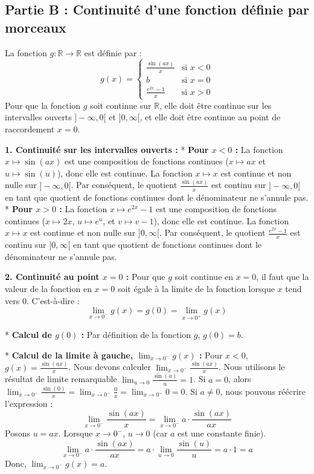 \documentclass[12pt,a4paper]{report}
\begin{document}
\subsection{Partie B : Continuité d'une fonction définie par morceaux}

La fonction $g: \mathbb{R} \to \mathbb{R}$ est définie par :
$$ g(x) = \begin{cases} \frac{\sin(ax)}{x} & \text{si } x < 0 \\ b & \text{si } x = 0 \\ \frac{e^{2x}-1}{x} & \text{si } x > 0 \end{cases} $$
Pour que la fonction $g$ soit continue sur $\mathbb{R}$, elle doit être continue sur les intervalles ouverts $]-\infty, 0[$ et $]0, \infty[$, et elle doit être continue au point de raccordement $x=0$.

\textbf{1. Continuité sur les intervalles ouverts :}
*   \textbf{Pour $x < 0$ :} La fonction $x \mapsto \sin(ax)$ est une composition de fonctions continues ($x \mapsto ax$ et $u \mapsto \sin(u)$), donc elle est continue. La fonction $x \mapsto x$ est continue et non nulle sur $]-\infty, 0[$. Par conséquent, le quotient $\frac{\sin(ax)}{x}$ est continu sur $]-\infty, 0[$ en tant que quotient de fonctions continues dont le dénominateur ne s'annule pas.
*   \textbf{Pour $x > 0$ :} La fonction $x \mapsto e^{2x}-1$ est une composition de fonctions continues ($x \mapsto 2x$, $u \mapsto e^u$, et $v \mapsto v-1$), donc elle est continue. La fonction $x \mapsto x$ est continue et non nulle sur $]0, \infty[$. Par conséquent, le quotient $\frac{e^{2x}-1}{x}$ est continu sur $]0, \infty[$ en tant que quotient de fonctions continues dont le dénominateur ne s'annule pas.

\textbf{2. Continuité au point $x=0$ :}
Pour que $g$ soit continue en $x=0$, il faut que la valeur de la fonction en $x=0$ soit égale à la limite de la fonction lorsque $x$ tend vers $0$. C'est-à-dire :
$$ \lim_{x \to 0^-} g(x) = g(0) = \lim_{x \to 0^+} g(x) $$

*   \textbf{Calcul de $g(0)$ :}
    Par définition de la fonction $g$, $g(0) = b$.

*   \textbf{Calcul de la limite à gauche, $\lim_{x \to 0^-} g(x)$ :}
    Pour $x < 0$, $g(x) = \frac{\sin(ax)}{x}$.
    Nous devons calculer $\lim_{x \to 0^-} \frac{\sin(ax)}{x}$.
    Nous utilisons le résultat de limite remarquable $\lim_{u \to 0} \frac{\sin(u)}{u} = 1$.
    Si $a=0$, alors $\lim_{x \to 0^-} \frac{\sin(0)}{x} = \lim_{x \to 0^-} \frac{0}{x} = \lim_{x \to 0^-} 0 = 0$.
    Si $a \ne 0$, nous pouvons réécrire l'expression :
    $$ \lim_{x \to 0^-} \frac{\sin(ax)}{x} = \lim_{x \to 0^-} a \cdot \frac{\sin(ax)}{ax} $$
    Posons $u = ax$. Lorsque $x \to 0^-$, $u \to 0$ (car $a$ est une constante finie).
    $$ \lim_{x \to 0^-} a \cdot \frac{\sin(ax)}{ax} = a \cdot \lim_{u \to 0} \frac{\sin(u)}{u} = a \cdot 1 = a $$
    Donc, $\lim_{x \to 0^-} g(x) = a$.
\end{document}
